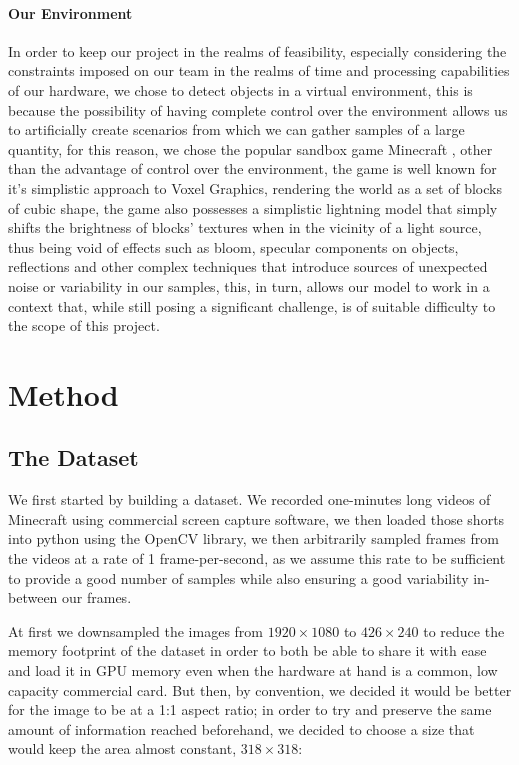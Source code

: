 \documentclass[10pt,journal,cspaper,compsoc]{IEEEtran}
\begin{document}
    
    \paragraph*{Our Environment}
    In order to keep our project in the realms of feasibility, especially considering the constraints imposed on our team in the 
    realms of time and processing capabilities of our hardware, we chose to detect objects in a virtual environment, this is because 
    the possibility of having complete control over the environment allows us to artificially create scenarios from which we can gather 
    samples of a large quantity, for this reason, we chose the popular sandbox game Minecraft \cite{Mojang-Minecraft}, other than 
    the advantage of control over the environment, the game is well known for it's simplistic approach to Voxel Graphics, rendering 
    the world as a set of blocks of cubic shape, the game also possesses a simplistic lightning model that simply shifts the brightness
    of blocks' textures when in the vicinity of a light source, thus being void of effects such as bloom, specular components on objects,
    reflections and other complex techniques that introduce sources of unexpected noise or variability in our samples, this, in turn, 
    allows our model to work in a context that, while still posing a significant challenge, is of suitable difficulty to the scope of 
    this project.



 \section{Method}   
    \subsection{The Dataset}
    We first started by building a dataset. We recorded one-minutes long videos of Minecraft using commercial screen capture software, we then loaded those shorts into python using the OpenCV library, we then arbitrarily sampled frames from the videos at a rate of 1 frame-per-second, as we assume this rate to be sufficient to provide a good number of samples while also ensuring a good variability in-between our frames. 

    At first we downsampled the images from $1920\times 1080$ to $426 \times 240$ to reduce the memory footprint of the dataset in order to both be able to share it with ease and load it in GPU memory even when the hardware at hand is a common, low capacity commercial card. But then, by convention, we decided it would be better for the image to be at a 1:1 aspect ratio; in order to try and preserve the same amount of information reached beforehand, we decided to choose a size that would keep the area almost constant, $318\times 318$:
\end{document}
